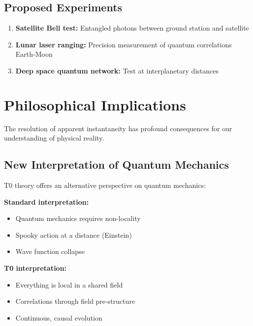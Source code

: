 \documentclass[12pt,a4paper]{article}
\begin{document}
	\subsection{Proposed Experiments}
	
	\begin{enumerate}
		\item \textbf{Satellite Bell test:} Entangled photons between ground station and satellite
		\item \textbf{Lunar laser ranging:} Precision measurement of quantum correlations Earth-Moon
		\item \textbf{Deep space quantum network:} Test at interplanetary distances
	\end{enumerate}
	
	\section{Philosophical Implications}
	
	The resolution of apparent instantaneity has profound consequences for our understanding of physical reality.
	
	\subsection{New Interpretation of Quantum Mechanics}
	
	T0 theory offers an alternative perspective on quantum mechanics:
	
	\begin{tcolorbox}[colback=t0red!5!white, colframe=t0red!75!black, title=New Perspective]
		\textbf{Standard interpretation:}
		\begin{itemize}
			\item Quantum mechanics requires non-locality
			\item Spooky action at a distance (Einstein)
			\item Wave function collapse
		\end{itemize}
		
		\textbf{T0 interpretation:}
		\begin{itemize}
			\item Everything is local in a shared field
			\item Correlations through field pre-structure
			\item Continuous, causal evolution
		\end{itemize}
	\end{tcolorbox}
	
\end{document}
